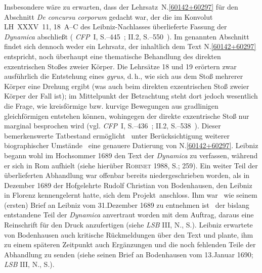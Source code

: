 Insbesondere wäre zu erwarten, dass der \glqq Lehrsatz\grqq\ N.\;\ref{60142+60297} für den Abschnitt \textit{De concursu corporum} gedacht war, der die im Konvolut LH~XXXV~11, 18~A--C des Leibniz-Nachlasses überlieferte Fassung der \textit{Dynamica}\cite{01354} abschließt (%
\textit{CFP}~I, S.--445~; II.2, S.--550~).\cite{01354}
Im genannten Abschnitt findet sich dennoch weder ein Lehrsatz, der inhaltlich dem Text N.\;\ref{60142+60297} entspricht, noch überhaupt eine thematische Behandlung des direkten exzentrischen Stoßes zweier Körper.
Die Lehrsätze 18 und 19 erörtern zwar ausführlich die Entstehung eines \textit{gyrus}, d.\,h., wie sich aus dem Stoß mehrerer Körper eine Drehung ergibt (was auch beim direkten exzentrischen Stoß zweier Körper der Fall ist); im Mittelpunkt der Betrachtung steht dort %
jedoch wesentlich die Frage, wie kreisförmige bzw. kurvige Bewegungen aus gradlinigen gleichförmigen entstehen können, wohingegen der direkte exzentrische Stoß nur marginal besprochen wird (vgl. %
\textit{CFP}~I, S.--436~; II.2, S.--538~).\cite{01354}
Dieser bemerkenswerte Tatbestand ermöglicht \textendash\ unter Berücksichtigung weiterer biographischer Umstände \textendash\ eine genauere Datierung von N.\;\ref{60142+60297}.
\pend%
\pstart%
%
Leibniz begann wohl im Hochsommer 1689 den Text der \textit{Dynamica}\cite{01354} zu verfassen, während er sich in Rom aufhielt (siehe hierüber \textsc{Robinet} 1988, S.; 259\cite{01240}).
Ein weiter Teil der überlieferten Abhandlung war offenbar bereits niedergeschrieben worden, als in Dezember 1689 der Hofgelehrte Rudolf Christian von Bodenhausen, den Leibniz in Florenz kennengelernt hatte, sich dem \glqq Projekt\grqq\ anschloss.
Ihm war \textendash\ wie seinem (ersten) Brief an Leibniz vom 31.\;Dezember 1689 zu entnehmen ist \textendash\ der bislang entstandene Teil der \textit{Dynamica}\cite{01354} anvertraut worden mit dem Auftrag, daraus eine Reinschrift für den Druck anzufertigen (siehe \textit{LSB} III, N., S.).\cite{01384}
Leibniz erwartete von Bodenhausen auch kritische Rückmeldungen über den Text und plante, ihm zu einem späteren Zeitpunkt auch Ergänzungen und die noch fehlenden Teile der Abhandlung zu senden (siehe seinen Brief an Bodenhausen vom 13.\;Januar 1690; \textit{LSB} III, N., S.).\cite{01385}

